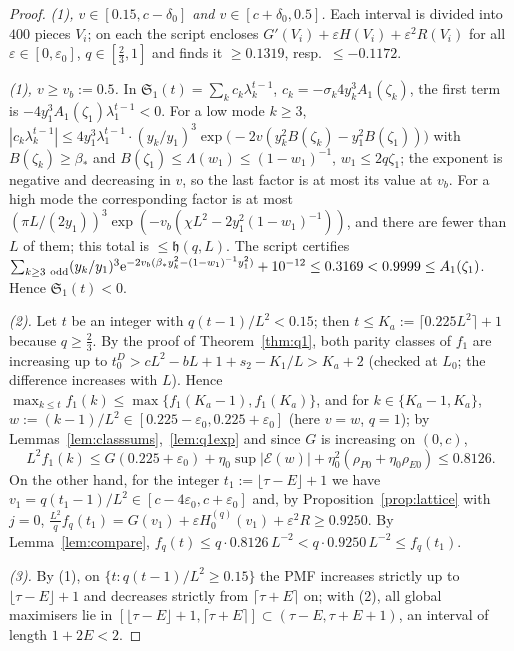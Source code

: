 \documentclass[11pt,a4paper]{article}
\theoremstyle{definition}
\theoremstyle{remark}
\newcommand{\ee}{\mathrm{e}}
\begin{document}
\begin{proof}
\emph{(1), $v\in[0.15,c-\delta_0]$ and $v\in[c+\delta_0,0.5]$.} Each interval is divided into $400$ pieces $V_i$; on
each the script encloses $G'(V_i)+\varepsilon H(V_i)+\varepsilon^2R(V_i)$ for all $\varepsilon\in[0,\varepsilon_0]$, $q\in[\frac23,1]$
and finds it $\ge0.1319$, resp.\ $\le-0.1172$.

\emph{(1), $v\ge v_b:=0.5$.} In $\mathfrak S_1(t)=\sum_kc_k\lambda_k^{t-1}$, $c_k=-\sigma_k4y_k^3A_1(\zeta_k)$, the first term is
$-4y_1^3A_1(\zeta_1)\lambda_1^{t-1}<0$. For a low mode $k\ge3$,
$|c_k\lambda_k^{t-1}|\le4y_1^3\lambda_1^{t-1}\cdot(y_k/y_1)^3\exp\bigl(-2v(y_k^2B(\zeta_k)-y_1^2B(\zeta_1))\bigr)$ with
$B(\zeta_k)\ge\beta_*$ and $B(\zeta_1)\le\Lambda(w_1)\le(1-w_1)^{-1}$, $w_1\le2q\zeta_1$; the exponent is negative and
decreasing in $v$, so the last factor is at most its value at $v_b$. For a high mode the corresponding factor is at most
$(\pi L/(2y_1))^3\exp(-v_b(\chi L^2-2y_1^2(1-w_1)^{-1}))$, and there are fewer than $L$ of them; this total is
$\le\mathfrak h(q,L)$. The script certifies
$\sum_{k\ge3\ \rm odd}(y_k/y_1)^3\ee^{-2v_b(\beta_*y_k^2-(1-w_1)^{-1}y_1^2)}+10^{-12}\le0.3169<0.9999\le A_1(\zeta_1)$.
Hence $\mathfrak S_1(t)<0$.

\emph{(2).} Let $t$ be an integer with $q(t-1)/L^2<0.15$; then $t\le K_a:=\lceil0.225L^2\rceil+1$ because $q\ge\frac23$.
By the proof of Theorem~\ref{thm:q1}, both parity classes of $f_1$ are increasing up to
$t_0^D>cL^2-bL+1+s_2-K_1/L>K_a+2$ (checked at $L_0$; the difference increases with $L$). Hence
$\max_{k\le t}f_1(k)\le\max\{f_1(K_a-1),f_1(K_a)\}$, and for $k\in\{K_a-1,K_a\}$,
$w:=(k-1)/L^2\in[0.225-\varepsilon_0,0.225+\varepsilon_0]$ (here $v=w$, $q=1$); by Lemmas~\ref{lem:classsums},~\ref{lem:q1exp} and since $G$ is
increasing on $(0,c)$,
\[
  L^2f_1(k)\le G(0.225+\varepsilon_0)+\eta_0\sup|\mathcal E(w)|+\eta_0^2(\rho_{P0}+\eta_0\rho_{E0})\le0.8126 .
\]
On the other hand, for the integer $t_1:=\lfloor\tau-E\rfloor+1$ we have $v_1=q(t_1-1)/L^2\in[c-4\varepsilon_0,c+\varepsilon_0]$
and, by Proposition~\ref{prop:lattice} with $j=0$, $\frac{L^2}qf_q(t_1)=G(v_1)+\varepsilon H_0^{(q)}(v_1)+\varepsilon^2R\ge0.9250$.
By Lemma~\ref{lem:compare}, $f_q(t)\le q\cdot0.8126\,L^{-2}<q\cdot0.9250\,L^{-2}\le f_q(t_1)$.

\emph{(3).} By (1), on $\{t:q(t-1)/L^2\ge0.15\}$ the PMF increases strictly up to $\lfloor\tau-E\rfloor+1$ and
decreases strictly from $\lceil\tau+E\rceil$ on; with (2), all global maximisers lie in
$[\lfloor\tau-E\rfloor+1,\lceil\tau+E\rceil]\subset(\tau-E,\tau+E+1)$, an interval of length $1+2E<2$.


\end{proof}
\end{document}
